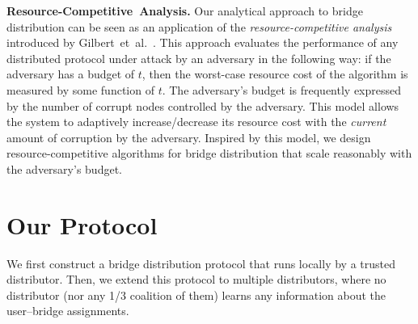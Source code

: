 \documentclass[letterpaper,twocolumn,10pt]{article}
\newcommand{\etal}{et~al.}
\newcommand{\sfsize}{\fontsize{0.73\baselineskip}{0.73\baselineskip}\selectfont}
\newcommand{\sans}[1]{\textsf{\sfsize \mbox{#1}}}
\newcommand{\sansb}[1]{\textbf{\sans{\mbox{#1}}}}
\newcommand{\para}[1]{\vspace{0.55em} \noindent \sansb{{\mbox{#1}}}}
\begin{document}


\para{Resource-Competitive Analysis.} Our analytical approach to bridge distribution can be seen as an application of the \emph{resource-competitive analysis} introduced by Gilbert~\etal~\cite{Gilbert:2012:RAN:2335470.2335471,Bender:2015:SIGACT}. This approach evaluates the performance of any distributed protocol under attack by an adversary in the following way: if the adversary has a budget of $t$, then the worst-case resource cost of the algorithm is measured by some function of $t$. The adversary's budget is frequently expressed by the number of corrupt nodes controlled by the adversary. This model allows the system to adaptively increase/decrease its resource cost with the \emph{current} amount of corruption by the adversary. Inspired by this model, we design resource-competitive algorithms for bridge distribution that scale reasonably with the adversary's budget.

\section{Our Protocol} \label{sec:algorithm} 
We first construct a bridge distribution protocol that runs locally by a trusted distributor. Then, we extend this protocol to multiple distributors, where no distributor (nor any 1/3 coalition of them) learns any information about the user--bridge assignments.
\end{document}
